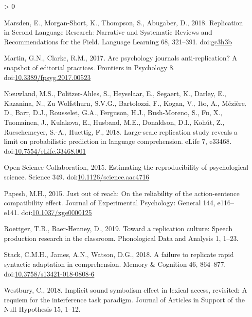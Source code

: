 \documentclass[]{elsarticle} %
\newlength{\cslhangindent}
\newenvironment{CSLReferences}[2] %
 {%
  \setlength{\parindent}{0pt}
  \ifodd #1 \everypar{\setlength{\hangindent}{\cslhangindent}}\ignorespaces\fi
  \ifnum #2 > 0
  \setlength{\parskip}{#2\baselineskip}
  \fi
 }%
 {}
\begin{document}
\begin{CSLReferences}{1}{0}
\leavevmode\hypertarget{ref-marsden_replication_2018}{}%
Marsden, E., Morgan‐Short, K., Thompson, S., Abugaber, D., 2018.
Replication in {Second} {Language} {Research}: {Narrative} and
{Systematic} {Reviews} and {Recommendations} for the {Field}. Language
Learning 68, 321--391. doi:\href{https://doi.org/gc3h3b}{gc3h3b}

\leavevmode\hypertarget{ref-martinclarke_policies_2017}{}%
Martin, G.N., Clarke, R.M., 2017. Are psychology journals
anti-replication? A snapshot of editorial practices. Frontiers in
Psychology 8.
doi:\href{https://doi.org/10.3389/fpsyg.2017.00523}{10.3389/fpsyg.2017.00523}

\leavevmode\hypertarget{ref-nieuwland_large-scale_2018}{}%
Nieuwland, M.S., Politzer-Ahles, S., Heyselaar, E., Segaert, K., Darley,
E., Kazanina, N., Zu Wolfsthurn, S.V.G., Bartolozzi, F., Kogan, V., Ito,
A., Mézière, D., Barr, D.J., Rousselet, G.A., Ferguson, H.J.,
Bush-Moreno, S., Fu, X., Tuomainen, J., Kulakova, E., Husband, M.E.,
Donaldson, D.I., Kohút, Z., Rueschemeyer, S.-A., Huettig, F., 2018.
Large-scale replication study reveals a limit on probabilistic
prediction in language comprehension. eLife 7, e33468.
doi:\href{https://doi.org/10.7554/eLife.33468.001}{10.7554/eLife.33468.001}

\leavevmode\hypertarget{ref-open_science_collaboration_estimating_2015}{}%
Open Science Collaboration, 2015. Estimating the reproducibility of
psychological science. Science 349.
doi:\href{https://doi.org/10.1126/science.aac4716}{10.1126/science.aac4716}

\leavevmode\hypertarget{ref-papesh_just_2015}{}%
Papesh, M.H., 2015. Just out of reach: {On} the reliability of the
action-sentence compatibility effect. Journal of Experimental
Psychology: General 144, e116--e141.
doi:\href{https://doi.org/10.1037/xge0000125}{10.1037/xge0000125}

\leavevmode\hypertarget{ref-roettger2019toward}{}%
Roettger, T.B., Baer-Henney, D., 2019. Toward a replication culture:
Speech production research in the classroom. Phonological Data and
Analysis 1, 1--23.

\leavevmode\hypertarget{ref-stack_failure_2018}{}%
Stack, C.M.H., James, A.N., Watson, D.G., 2018. A failure to replicate
rapid syntactic adaptation in comprehension. Memory \& Cognition 46,
864--877.
doi:\href{https://doi.org/10.3758/s13421-018-0808-6}{10.3758/s13421-018-0808-6}

\leavevmode\hypertarget{ref-westbury_implicit_2018}{}%
Westbury, C., 2018. Implicit sound symbolism effect in lexical access,
revisited: {A} requiem for the interference task paradigm. Journal of
Articles in Support of the Null Hypothesis 15, 1--12.

\end{CSLReferences}
\end{document}
